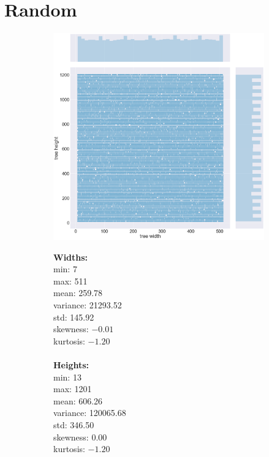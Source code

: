 \section{Random}
\label{appendix:data:rand}
\begin{figure}[H]
\centering
\begin{subfigure}{.8\textwidth}
	\includegraphics[width=.9\textwidth]{img/1_RAND_plot.png}
\end{subfigure}%
\begin{subfigure}{.2\textwidth}
  \centering
  \begin{minipage}{1\textwidth}
\textbf{Widths:}
\\
min: 7
\\
max: 511
\\
mean: 259.78
\\
variance: 21293.52
\\
std: 145.92
\\
skewness: $-0.01$
\\
kurtosis: $-1.20$
\\\\
\textbf{Heights:}
\\
min: 13
\\
max: 1201
\\
mean: 606.26
\\
variance: 120065.68
\\
std: 346.50
\\
skewness: 0.00
\\
kurtosis: $-1.20$
  \end{minipage}
\end{subfigure}
\end{figure}

